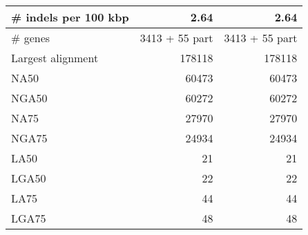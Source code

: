 \documentclass[12pt,a4paper]{article}
\begin{document}
\begin{table}[ht]
\begin{center}
\begin{tabular}{|l*{2}{|r}|}
\# indels per 100 kbp & 2.64 & 2.64 \\ \hline
\# genes & 3413 + 55 part & 3413 + 55 part \\ \hline
Largest alignment & 178118 & 178118 \\ \hline
NA50 & 60473 & 60473 \\ \hline
NGA50 & 60272 & 60272 \\ \hline
NA75 & 27970 & 27970 \\ \hline
NGA75 & 24934 & 24934 \\ \hline
LA50 & 21 & 21 \\ \hline
LGA50 & 22 & 22 \\ \hline
LA75 & 44 & 44 \\ \hline
LGA75 & 48 & 48 \\ \hline
\end{tabular}
\end{center}
\end{table}
\end{document}
